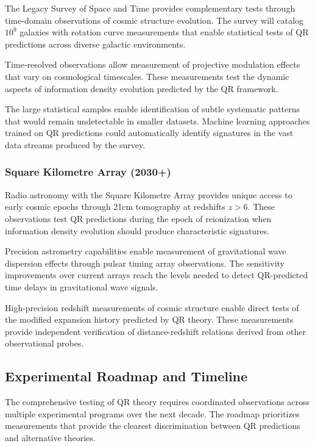 The Legacy Survey of Space and Time provides complementary tests through time-domain observations of cosmic structure evolution. The survey will catalog $10^9$ galaxies with rotation curve measurements that enable statistical tests of QR predictions across diverse galactic environments.

Time-resolved observations allow measurement of projective modulation effects that vary on cosmological timescales. These measurements test the dynamic aspects of information density evolution predicted by the QR framework.

The large statistical samples enable identification of subtle systematic patterns that would remain undetectable in smaller datasets. Machine learning approaches trained on QR predictions could automatically identify signatures in the vast data streams produced by the survey.

\subsubsection{Square Kilometre Array (2030+)}
\label{subsubsec:ska}

Radio astronomy with the Square Kilometre Array provides unique access to early cosmic epochs through 21cm tomography at redshifts $z > 6$. These observations test QR predictions during the epoch of reionization when information density evolution should produce characteristic signatures.

Precision astrometry capabilities enable measurement of gravitational wave dispersion effects through pulsar timing array observations. The sensitivity improvements over current arrays reach the levels needed to detect QR-predicted time delays in gravitational wave signals.

High-precision redshift measurements of cosmic structure enable direct tests of the modified expansion history predicted by QR theory. These measurements provide independent verification of distance-redshift relations derived from other observational probes.

\subsection{Experimental Roadmap and Timeline}
\label{subsec:experimental-roadmap}

The comprehensive testing of QR theory requires coordinated observations across multiple experimental programs over the next decade. The roadmap prioritizes measurements that provide the clearest discrimination between QR predictions and alternative theories.

